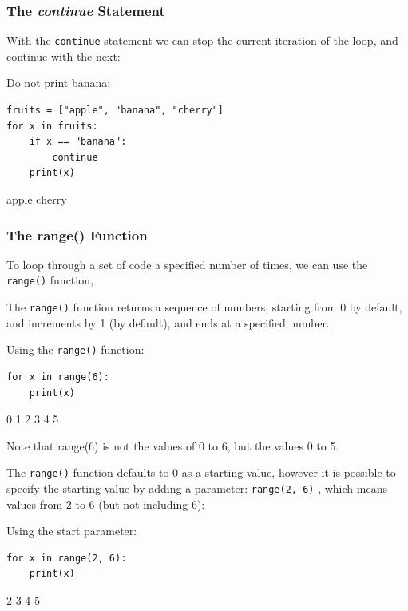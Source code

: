 \documentclass[12pt,a4paper]{article}
\newcommand{\code}[1]{%
	\colorbox{backcolour}{\lstinline{#1}}%
}
\newcommand{\lcode}[1]{%
	\lstinline{#1}%
}
\begin{document}
\subsubsection{The \textit{continue} Statement}

With the \code{continue} statement we can stop the current iteration of the
loop, and continue with the next:

\begin{ebox}
Do not print banana:
	\begin{lstlisting}
fruits = ["apple", "banana", "cherry"]
for x in fruits:
    if x == "banana":
        continue
    print(x) 
	\end{lstlisting}
\tcblower
	\begin{vercode}
apple
cherry
	\end{vercode}
\end{ebox}
\subsubsection{The range() Function}

To loop through a set of code a specified number of times, we can use the
\code{range()} function,

The \code{range()} function returns a sequence of numbers, starting from 0 by
default, and increments by 1 (by default), and ends at a specified number.

\begin{ebox}
Using the \lcode{range()} function:
	\begin{lstlisting}
for x in range(6):
    print(x)
	\end{lstlisting}
\tcblower
	\begin{vercode}
0
1
2
3
4
5
	\end{vercode}
\end{ebox}

\begin{nbox}
Note that range(6) is not the values of 0 to 6, but the values 0 to 5.
\end{nbox}

The \code{range()} function defaults to 0 as a starting value, however it is
possible to specify the starting value by adding a parameter:
\code{range(2, 6)}, which means values from 2 to 6 (but not including 6):

\begin{ebox}
Using the start parameter:
	\begin{lstlisting}
for x in range(2, 6):
    print(x)
	\end{lstlisting}
\tcblower
	\begin{vercode}
2
3
4
5
	\end{vercode}
\end{ebox}
\end{document}
